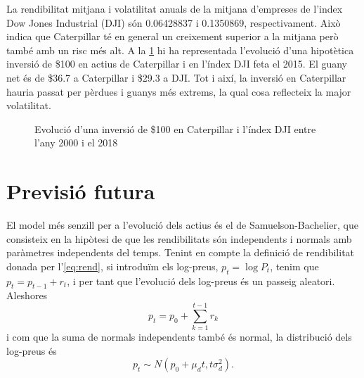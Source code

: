 \documentclass{article}
\numberwithin{table}{section}
\numberwithin{figure}{section}
\numberwithin{equation}{section}
\begin{document}
La rendibilitat mitjana i volatilitat anuals de la mitjana d'empreses de l'index Dow Jones Industrial (DJI) són \num{0.06428837} i \num{0.1350869}, respectivament. Això indica que Caterpillar té en general un creixement superior a la mitjana però també amb un risc més alt. A la \cref{fig:inversio} hi ha representada l'evolució d'una hipotètica inversió de \$100 en actius de Caterpillar i en l'índex DJI feta el 2015. El guany net és de \$36.7 a Caterpillar i \$29.3 a DJI. Tot i així, la inversió en Caterpillar hauria passat per pèrdues i guanys més extrems, la qual cosa reflecteix la major volatilitat.
\begin{figure}[htb]
	\centering \sffamily \small
	
	\caption{Evolució d'una inversió de \$100 en Caterpillar i l'índex DJI entre l'any 2000 i el 2018}
	\label{fig:inversio}
\end{figure}

\section{Previsió futura}
El model més senzill per a l'evolució dels actius és el de Samuelson-Bachelier, que consisteix en la hipòtesi de que les rendibilitats són independents i normals amb paràmetres independents del temps. Tenint en compte la definició de rendibilitat donada per l'\cref{eq:rend}, si introduïm els log-preus, \( p_t = \log{P_t} \), tenim que \( p_t = p_{t-1} + r_t \), i per tant que l'evolució dels log-preus és un passeig aleatori. Aleshores
\begin{equation} \label{eqn:passeig aleatori}
	p_t = p_0 + \sum_{k = 1}^{t-1}r_k 
\end{equation}
i com que la suma de normals independents també és normal, la distribució dels log-preus és
\begin{equation} \label{eqn:distribucio log-preus}
	p_t \sim N(p_0 + \mu_d t, t\sigma_d^2).
\end{equation}
\end{document}
